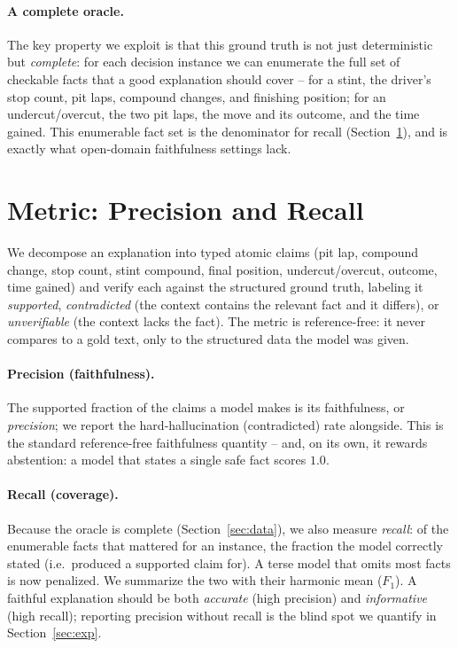 \documentclass[11pt]{article}
\begin{document}
\paragraph{A complete oracle.} The key property we exploit is that this ground truth is
not just deterministic but \emph{complete}: for each decision instance we can enumerate
the full set of checkable facts that a good explanation should cover -- for a stint, the
driver's stop count, pit laps, compound changes, and finishing position; for an
undercut/overcut, the two pit laps, the move and its outcome, and the time gained. This
enumerable fact set is the denominator for recall (Section~\ref{sec:metric}), and is
exactly what open-domain faithfulness settings lack.

\section{Metric: Precision and Recall}\label{sec:metric}
We decompose an explanation into typed atomic claims (pit lap, compound change,
stop count, stint compound, final position, undercut/overcut, outcome, time
gained) and verify each against the structured ground truth, labeling it
\emph{supported}, \emph{contradicted} (the context contains the relevant fact and it
differs), or \emph{unverifiable} (the context lacks the fact). The metric is
reference-free: it never compares to a gold text, only to the structured data the model
was given.

\paragraph{Precision (faithfulness).} The supported fraction of the claims a model makes
is its faithfulness, or \emph{precision}; we report the hard-hallucination (contradicted)
rate alongside. This is the standard reference-free faithfulness quantity -- and, on its
own, it rewards abstention: a model that states a single safe fact scores $1.0$.

\paragraph{Recall (coverage).} Because the oracle is complete (Section~\ref{sec:data}),
we also measure \emph{recall}: of the enumerable facts that mattered for an instance, the
fraction the model correctly stated (i.e.\ produced a supported claim for). A terse model
that omits most facts is now penalized. We summarize the two with their harmonic mean
($F_1$). A faithful explanation should be both \emph{accurate} (high precision) and
\emph{informative} (high recall); reporting precision without recall is the blind spot we
quantify in Section~\ref{sec:exp}.
\end{document}
